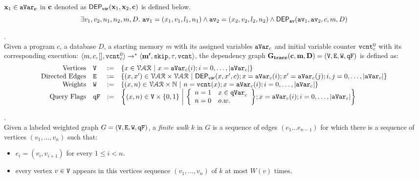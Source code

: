 \documentclass[a4paper,11pt]{article}
\begin{document}
{\begin{defn}
${\boldsymbol{\mathbf{x}}}_1 \in \mathtt{aVar}_{{\boldsymbol{\mathbf{c}}}}$ in ${\boldsymbol{\mathbf{c}}}$ denoted as 
%
$\mathsf{DEP_{var}}({\boldsymbol{\mathbf{x}}}_1, {\boldsymbol{\mathbf{x}}}_2, {\boldsymbol{\mathbf{c}}})$ is defined below.
%
\[
\exists v_1, v_2, n_1, n_2, m, D. ~
\mathtt{av}_1 = (x_1, v_1, l_1, n_1)
\land
\mathtt{av}_2 = (x_2, v_2, l_2, n_2)
\land 
\mathsf{DEP_{\mathtt{av}}}(\mathtt{av}_1, \mathtt{av}_2, c, m, D)
\] 
%
%
\end{defn}
%
%
\begin{defn}.
\\
Given a program $c$, a database $D$, a starting memory $m$ with its assigned variables $\mathtt{aVar}_c$ and initial variable counter $\mathtt{vcnt}^0_{c}$ with its corresponding execution:
$\langle m, c, [], \mathtt{vcnt}^0_{c} \rangle 
\to^{*}
\langle {\boldsymbol{\mathbf{m'}}}, \mathtt{skip}, \mathtt{\tau}, \mathtt{vcnt} \rangle$,
the dependency graph $\bf{G_{trace}}(c, m, D) = (\mathtt{V}, \mathtt{E}, \mathtt{W}, \mathtt{qF})$ is defined as:
%
\[
\begin{array}{rlcl}
	\text{Vertices} &
	\vertxs & := & \left\{ 
	x \in \mathcal{VAR}
	~ \middle\vert ~
	x = \avar_{c}(i); i = 0, \ldots, |\avar_{c}| 
	\right\}
	\\
	\text{Directed Edges} &
	\edges & := & 
	\left\{ 
	(x, x') \in \mathcal{VAR} \times \mathcal{VAR}
	~ \middle\vert ~
	\vardep(x, x', c); 
	x = \avar_{c}(i); x' = \avar_{c}(j); i,j = 0, \ldots, |\avar_{c}| 
	\right\}
	\\
	\text{Weights} &
	\weights & := & 
	\left\{ 
	(x, n) \in \mathcal{VAR} \times \mathbb{N}
	~ \middle\vert ~
	n = \vcounter(x); x = \avar_{c}(i); i = 0, \ldots, |\avar_{c}|
	\right\}
	\\
	\text{Query Flags} &
	\qflag & := & 
	\left\{(x, n)  \in \vertxs \times \{0, 1\} 
	~ \middle\vert ~
	\left\{
	\begin{array}{ll}
	n = 1 & x \in \qvar_{c} \\ 
	n = 0 & o.w.
	\end{array}
	\right\};
	x = \avar_{c}(i); i = 0, \ldots, |\avar_{c}|
	\right\}
\end{array}
\]
\end{defn}
%
%
\begin{defn}.
\label{def:finitewalk}
\\
Given a labeled weighted graph $G = (\mathtt{V}, \mathtt{E}, \mathtt{W}, \mathtt{qF})$, a \emph{finite walk} $k$ in $G$ is a sequence of edges $(e_1 \ldots e_{n - 1})$ 
for which there is a sequence of vertices $(v_1, \ldots, v_{n})$ such that:
\begin{itemize}
    \item $e_i = (v_{i},v_{i + 1})$ for every $1 \leq i < n$.
    \item every vertex $v \in \mathtt{V}$ appears in this vertices sequence $(v_1, \ldots, v_{n})$ of $k$ at most $W(v)$ times.  

\end{itemize}
\end{defn}}
\end{document}
